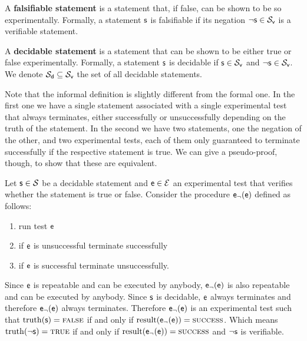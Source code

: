 \documentclass[11pt,letterpaper,fleqn]{memoir} %
\begin{document}
\begin{mathSection}
	\begin{defn}
		A \textbf{falsifiable statement} is a statement that, if false, can be shown to be so experimentally. Formally, a statement $\mathsf{s}$ is falsifiable if its negation $\neg\mathsf{s} \in \mathcal{S}_\textsf{v}$ is a verifiable statement.
	\end{defn}
	\begin{defn}
		A \textbf{decidable statement} is a statement that can be shown to be either true or false experimentally. Formally, a statement $\mathsf{s}$ is decidable if $\mathsf{s} \in \mathcal{S}_\textsf{v}$ and $\neg\mathsf{s} \in \mathcal{S}_\textsf{v}$. We denote $\mathcal{S}_\textsf{d} \subseteq \mathcal{S}_\textsf{v}$ the set of all decidable statements.
	\end{defn}
	\begin{justification}
		Note that the informal definition is slightly different from the formal one. In the first one we have a single statement associated with a single experimental test that always terminates, either successfully or unsuccessfully depending on the truth of the statement. In the second we have two statements, one the negation of the other, and two experimental tests, each of them only guaranteed to terminate successfully if the respective statement is true. We can give a pseudo-proof, though, to show that these are equivalent.

		Let $\mathsf{s} \in \mathcal{S}$ be a decidable statement and $\mathsf{e} \in \mathcal{E}$ an experimental test that verifies whether the statement is true or false. Consider the procedure $\mathsf{e}_\neg(\mathsf{e})$ defined as follows:
		\begin{enumerate}
			\item run test $\mathsf{e}$
			\item if $\mathsf{e}$ is unsuccessful terminate successfully
			\item if $\mathsf{e}$ is successful terminate unsuccessfully.
		\end{enumerate}
		Since $\mathsf{e}$ is repeatable and can be executed by anybody, $\mathsf{e}_\neg(\mathsf{e})$ is also repeatable and can be executed by anybody. Since $\mathsf{s}$ is decidable, $\mathsf{e}$ always terminates and therefore $\mathsf{e}_\neg(\mathsf{e})$ always terminates.  Therefore $\mathsf{e}_\neg(\mathsf{e})$ is an experimental test such that $\operatorname{truth}(\mathsf{s})=\textsc{false}$ if and only if $\operatorname{result}(\mathsf{e}_\neg(\mathsf{e}))=\textsc{success}$. Which means $\operatorname{truth}(\neg\mathsf{s})=\textsc{true}$ if and only if $\operatorname{result}(\mathsf{e}_\neg(\mathsf{e}))=\textsc{success}$ and $\neg\mathsf{s}$ is verifiable.
		

\end{justification}
\end{mathSection}
\end{document}
